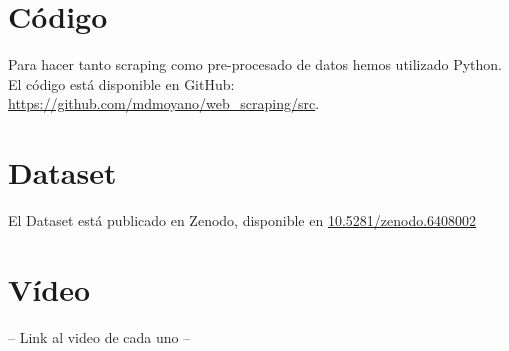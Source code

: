 \documentclass[IB]{PlantillaPACnova_Est}
\begin{document}
\section{Código}

Para hacer tanto scraping como pre-procesado de datos hemos utilizado Python. El código está disponible en GitHub: \url{https://github.com/mdmoyano/web_scraping/src}.

\section{Dataset}

El Dataset está publicado en Zenodo, disponible en  \url{10.5281/zenodo.6408002}


\section{Vídeo}

-- Link al video de cada uno --



%
%
\newpage

 
\end{document}

